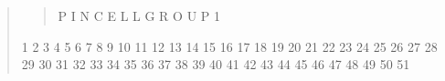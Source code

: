 \documentclass[letterpaper,10pt,english]{sphinxmanual}
\begin{document}
\begin{quote}
\begin{quote}
P I N  C E L L       G R O U P 1
\end{quote}

\begin{DUlineblock}{0em}
\item[] 1        2        3        4        5        6        7        8        9           10           11           12           13           14           15           16           17           18           19           20           21           22           23           24           25           26           27           28           29           30           31           32           33           34           35           36           37           38           39           40           41           42           43           44           45           46           47           48           49           50           51
\end{DUlineblock}


\end{quote}
\end{document}
